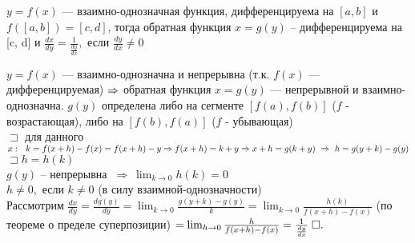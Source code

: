 \documentclass{article}
\begin{document}

\theorem

$y = f(x)$ --- взаимно-однозначная функция, дифференцируема на $[a,b]$ и $f([a, b]) = [c, d]$, тогда обратная функция $x = g(y)$ -- дифференцируема на [c, d] и $\frac{dx}{dy} = \frac{1}{\frac{dy}{dx}},$ если $\frac{dy}{dx} \ne 0$

\proof

$y = f(x)$ --- взаимно-однозначна и непрерывна (т.к. $f(x)$ --- дифференцируемая) $\Rarr$ обратная функция $x = g(y)$ --- непрерывной и взаимно-однозначна. $g(y)$ определена либо на сегменте $[f(a), f(b)]$ ($f$ - возрастающая), либо на $[f(b), f(a)]$ ($f$ - убывающая) \\

$\sqsupset$ для данного $x: \ \ k = f(x+h) - f(x) = f(x+h) - y \Rarr f(x+h) = k + y \Rarr x + h = g(k+y) \ \Rightarrow \ h = g(y+k) - g(y)$ \\
$\sqsupset h = h(k)$ \\

$g(y)$ -- непрерывна $\ \Rightarrow \ \lim_{k \to 0} h(k) = 0$ \\
$h \ne 0,$ если $k \ne 0$ (в силу взаимной-однозначности) \\

Рассмотрим $\frac{dx}{dy} = \frac{dg(y)}{dy} = \lim_{k \to 0} \frac{g(y+k) - g(y)}{k} = \lim_{k \to 0} \frac{h(k)}{f(x+h) - f(x)}$ (по теореме о пределе суперпозиции) $= \lim_{h \to 0} \frac{h}{f(x+h) - f(x)} = \frac{1}{\frac{dy}{dx}}\qed$
\end{document}
